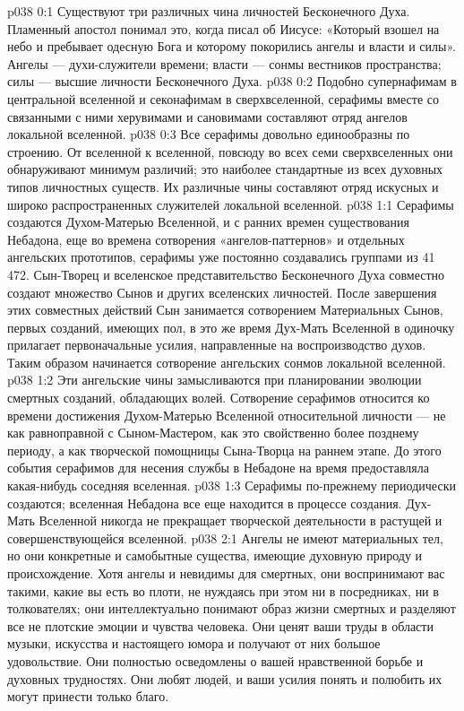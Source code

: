 \author{Мелхиседек}
\vs p038 0:1 Существуют три различных чина личностей Бесконечного Духа. Пламенный апостол понимал это, когда писал об Иисусе: «Который взошел на небо и пребывает одесную Бога и которому покорились ангелы и власти и силы». Ангелы --- духи\hyp{}служители времени; власти --- сонмы вестников пространства; силы --- высшие личности Бесконечного Духа.
\vs p038 0:2 \pc Подобно супернафимам в центральной вселенной и секонафимам в сверхвселенной, серафимы вместе со связанными с ними херувимами и сановимами составляют отряд ангелов локальной вселенной.
\vs p038 0:3 Все серафимы довольно единообразны по строению. От вселенной к вселенной, повсюду во всех семи сверхвселенных они обнаруживают минимум различий; это наиболее стандартные из всех духовных типов личностных существ. Их различные чины составляют отряд искусных и широко распространенных служителей локальной вселенной.
\vs p038 1:1 Серафимы создаются Духом\hyp{}Матерью Вселенной, и с ранних времен существования Небадона, еще во времена сотворения «ангелов\hyp{}паттернов» и отдельных ангельских прототипов, серафимы уже постоянно создавались группами из 41\,472. Сын\hyp{}Творец и вселенское представительство Бесконечного Духа совместно создают множество Сынов и других вселенских личностей. После завершения этих совместных действий Сын занимается сотворением Материальных Сынов, первых созданий, имеющих пол, в это же время Дух\hyp{}Мать Вселенной в одиночку прилагает первоначальные усилия, направленные на воспроизводство духов. Таким образом начинается сотворение ангельских сонмов локальной вселенной.
\vs p038 1:2 Эти ангельские чины замысливаются при планировании эволюции смертных созданий, обладающих волей. Сотворение серафимов относится ко времени достижения Духом\hyp{}Матерью Вселенной относительной личности --- не как равноправной с Сыном\hyp{}Мастером, как это свойственно более позднему периоду, а как творческой помощницы Сына\hyp{}Творца на раннем этапе. До этого события серафимов для несения службы в Небадоне на время предоставляла какая\hyp{}нибудь соседняя вселенная.
\vs p038 1:3 Серафимы по\hyp{}прежнему периодически создаются; вселенная Небадона все еще находится в процессе создания. Дух\hyp{}Мать Вселенной никогда не прекращает творческой деятельности в растущей и совершенствующейся вселенной.
\vs p038 2:1 Ангелы не имеют материальных тел, но они конкретные и самобытные существа, имеющие духовную природу и происхождение. Хотя ангелы и невидимы для смертных, они воспринимают вас такими, какие вы есть во плоти, не нуждаясь при этом ни в посредниках, ни в толкователях; они интеллектуально понимают образ жизни смертных и разделяют все не плотские эмоции и чувства человека. Они ценят ваши труды в области музыки, искусства и настоящего юмора и получают от них большое удовольствие. Они полностью осведомлены о вашей нравственной борьбе и духовных трудностях. Они любят людей, и ваши усилия понять и полюбить их могут принести только благо.
